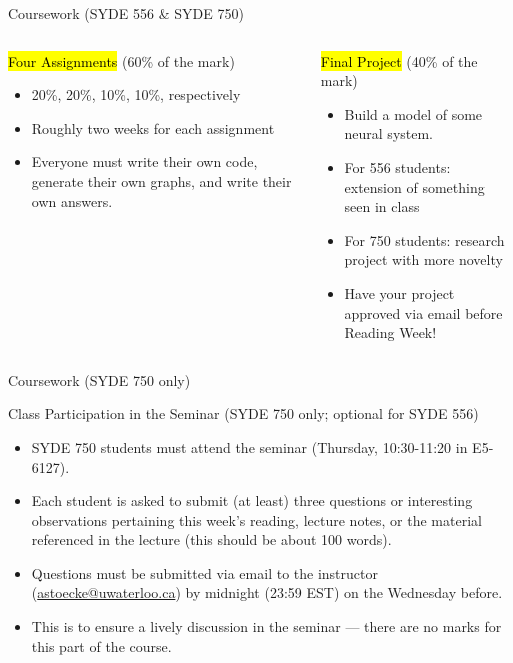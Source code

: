 \documentclass[aspectratio=169]{beamer}
\begin{document}
\begin{frame}{Coursework (SYDE 556 \& SYDE 750)}
	\begin{columns}[t]
		\begin{block}{\hl{Four Assignments} (60\% of the mark)}
		\begin{itemize}
				\item 20\%, 20\%, 10\%, 10\%, respectively
				\item Roughly two weeks for each assignment
				\item Everyone must write their own code, generate their own graphs, and write their own answers.
			\end{itemize}
		\end{block}
		\begin{block}{\hl{Final Project} (40\% of the mark)}
			\begin{itemize}
				\item Build a model of some neural system.
				\item For 556 students: extension of something seen in class
				\item For 750 students: research project with more novelty
				\item Have your project approved via email before Reading Week!
			\end{itemize}
		\end{block}
	\end{columns}
\end{frame}

\begin{frame}{Coursework (SYDE 750 only)}
	\begin{block}{Class Participation in the Seminar  (SYDE 750 only; optional for SYDE 556)}
	\begin{itemize}
		\item SYDE 750 students must attend the seminar (Thursday, 10:30-11:20 in E5-6127).
		\item Each student is asked to submit (at least) three questions or interesting observations pertaining this week's reading, lecture notes, or the material referenced in the lecture (this should be about 100 words).
		\item Questions must be submitted via email to the instructor (\url{astoecke@uwaterloo.ca}) by midnight (23:59 EST) on the Wednesday before.
		\item This is to ensure a lively discussion in the seminar --- there are no marks for this part of the course.
	\end{itemize}
	\end{block}
\end{frame}
\end{document}
